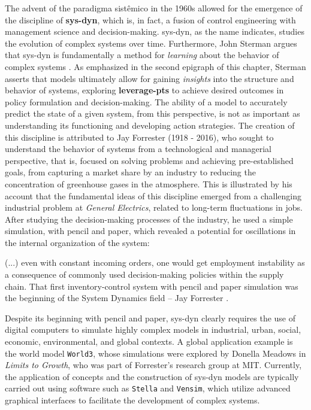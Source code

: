 \documentclass[./main_en.tex]{subfiles}
\begin{document}
\par The advent of the \gls{paradigma} sistêmico in the 1960s allowed for the emergence of the discipline of \textbf{\gls{sys-dyn}}, which is, in fact, a fusion of control engineering with management science and decision-making. \gls{sys-dyn}, as the name indicates, studies the evolution of complex systems over time. Furthermore, John Sterman argues that \gls{sys-dyn} is fundamentally a method for \textit{learning} about the behavior of complex systems \cite{sterman2000}. As emphasized in the second epigraph of this chapter, Sterman asserts that models ultimately allow for gaining \textit{insights} into the structure and behavior of systems, exploring \textbf{\gls{leverage-pts}} to achieve desired outcomes in policy formulation and decision-making. The ability of a \gls{model} to accurately predict the state of a given \gls{system}, from this perspective, is not as important as understanding its functioning and developing action strategies. The creation of this discipline is attributed to Jay Forrester (1918 - 2016), who sought to understand the behavior of systems from a technological and managerial perspective, that is, focused on solving problems and achieving pre-established goals, from capturing a market share by an industry to reducing the concentration of greenhouse gases in the atmosphere. This is illustrated by his account that the fundamental ideas of this discipline emerged from a challenging industrial problem at \textit{General Electrics}, related to long-term fluctuations in jobs. After studying the decision-making processes of the industry, he used a simple simulation, with pencil and paper, which revealed a potential for oscillations in the internal organization of the \gls{system}:

\begin{adjustwidth}{100pt}{0pt}
\medskip
\small (...) even with constant incoming orders, one would get employment instability as a consequence of commonly used decision-making policies within the supply chain. That ﬁrst inventory-control system with pencil and paper simulation was the beginning of the System Dynamics ﬁeld – Jay Forrester \cite{forrester2007}.
\medskip
\end{adjustwidth}

\par Despite its beginning with pencil and paper, \gls{sys-dyn} clearly requires the use of digital computers to simulate highly complex models in industrial, urban, social, economic, environmental, and global contexts. A global application example is the world model \texttt{World3}, whose simulations were explored by Donella Meadows in \textit{Limits to Growth}, who was part of Forrester's research group at MIT. Currently, the application of concepts and the construction of \gls{sys-dyn} models are typically carried out using software such as \texttt{Stella} and \texttt{Vensim}, which utilize advanced graphical interfaces to facilitate the development of complex systems.
\end{document}
